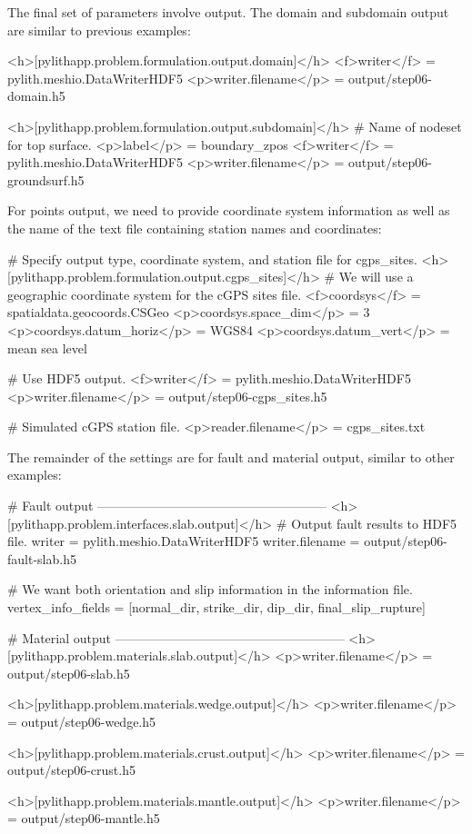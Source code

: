 The final set of parameters involve output. The domain and subdomain
output are similar to previous examples:
\begin{cfg}
<h>[pylithapp.problem.formulation.output.domain]</h>
<f>writer</f> = pylith.meshio.DataWriterHDF5
<p>writer.filename</p> = output/step06-domain.h5

<h>[pylithapp.problem.formulation.output.subdomain]</h>
# Name of nodeset for top surface.
<p>label</p> = boundary_zpos
<f>writer</f> = pylith.meshio.DataWriterHDF5
<p>writer.filename</p> = output/step06-groundsurf.h5
\end{cfg}
For points output, we need to provide coordinate system information as
well as the name of the text file containing station names and
coordinates:
\begin{cfg}
# Specify output type, coordinate system, and station file for cgps_sites.
<h>[pylithapp.problem.formulation.output.cgps_sites]</h>
# We will use a geographic coordinate system for the cGPS sites file.
<f>coordsys</f> = spatialdata.geocoords.CSGeo
<p>coordsys.space_dim</p> = 3
<p>coordsys.datum_horiz</p> = WGS84
<p>coordsys.datum_vert</p> = mean sea level

# Use HDF5 output.
<f>writer</f> = pylith.meshio.DataWriterHDF5
<p>writer.filename</p> = output/step06-cgps_sites.h5

# Simulated cGPS station file.
<p>reader.filename</p> = cgps_sites.txt
\end{cfg}
The remainder of the settings are for fault and material output,
similar to other examples:
\begin{cfg}
# Fault output ------------------------------------------------------
<h>[pylithapp.problem.interfaces.slab.output]</h>
# Output fault results to HDF5 file.
writer = pylith.meshio.DataWriterHDF5
writer.filename = output/step06-fault-slab.h5

# We want both orientation and slip information in the information file.
vertex_info_fields = [normal_dir, strike_dir, dip_dir, final_slip_rupture]

# Material output ------------------------------------------------------
<h>[pylithapp.problem.materials.slab.output]</h>
<p>writer.filename</p> = output/step06-slab.h5

<h>[pylithapp.problem.materials.wedge.output]</h>
<p>writer.filename</p> = output/step06-wedge.h5

<h>[pylithapp.problem.materials.crust.output]</h>
<p>writer.filename</p> = output/step06-crust.h5

<h>[pylithapp.problem.materials.mantle.output]</h>
<p>writer.filename</p> = output/step06-mantle.h5
\end{cfg}

